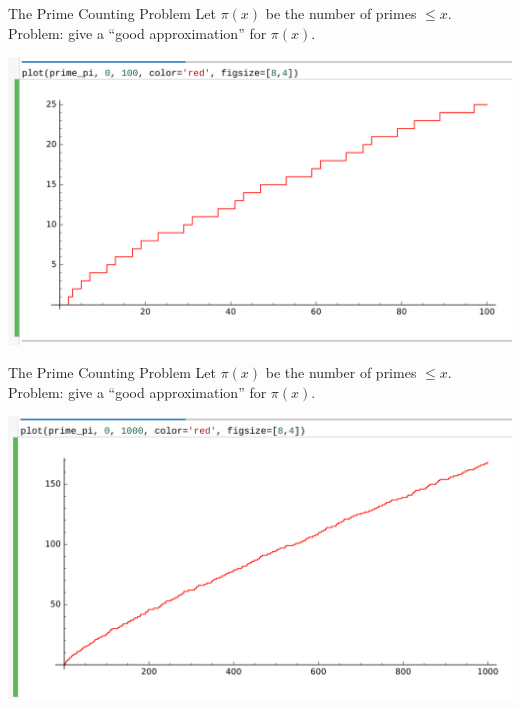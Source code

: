 \documentclass{beamer}
\begin{document}
\begin{frame}{The Prime Counting Problem}
  Let $\pi(x)$ be the number of primes $\leq x$.\\
  Problem: give a ``good approximation'' for $\pi(x)$.
  \vfill

  \includegraphics[width=.98\textwidth]{pics/prime-pi-100.png}

\end{frame}

\begin{frame}{The Prime Counting Problem}
  Let $\pi(x)$ be the number of primes $\leq x$.\\
  Problem: give a ``good approximation'' for $\pi(x)$.
  \vfill

  \includegraphics[width=.98\textwidth]{pics/prime-pi-1000.png}

\end{frame}
\end{document}

